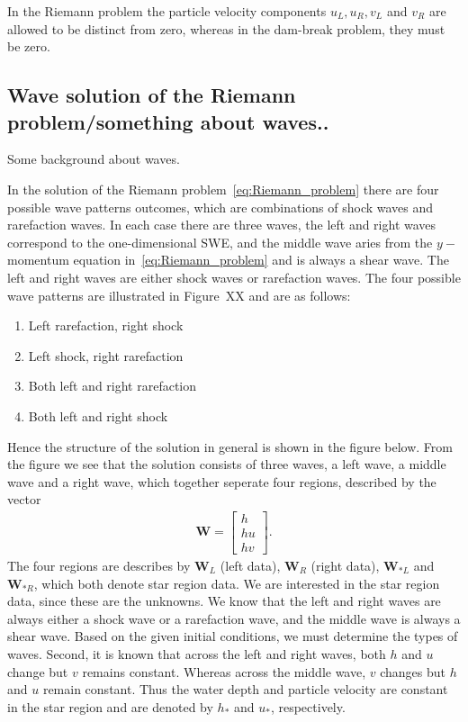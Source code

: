 In the Riemann problem the particle velocity components $u_L, u_R, v_L$ and $v_R$ are allowed to be distinct from zero, whereas in the dam-break problem, they must be zero.


\subsection{Wave solution of the Riemann problem/something about waves..}
Some background about waves.

In the solution of the Riemann problem~\eqref{eq:Riemann_problem} there are four possible wave patterns outcomes, which are combinations of shock waves and rarefaction waves.
In each case there are three waves, the left and right waves correspond to the one-dimensional SWE, and the middle wave aries from the $y-$momentum equation in~\eqref{eq:Riemann_problem} and is always a shear wave.
The left and right waves are either shock waves or rarefaction waves.
The four possible wave patterns are illustrated in Figure~XX and are as follows:
\begin{enumerate}
    \item Left rarefaction, right shock
    \item Left shock, right rarefaction
    \item Both left and right rarefaction
    \item Both left and right shock
\end{enumerate}
Hence the structure of the solution in general is shown in the figure below.
From the figure we see that the solution consists of three waves, a left wave, a middle wave and a right wave, which together seperate four regions, described by the vector
\begin{align*}
\mathbf{W} = \begin{bmatrix}
    h \\ hu \\ hv
    \end{bmatrix}.
\end{align*}
The four regions are describes by $\mathbf{W}_L$ (left data), $\mathbf{W}_R$ (right data), $\mathbf{W}_{*L}$ and $\mathbf{W}_{*R}$, which both denote star region data.
We are interested in the star region data, since these are the unknowns.
We know that the left and right waves are always either a shock wave or a rarefaction wave, and the middle wave is always a shear wave.
Based on the given initial conditions, we must determine the types of waves.
Second, it is known that across the left and right waves, both $h$ and $u$ change but $v$ remains constant.
Whereas across the middle wave, $v$ changes but $h$ and $u$ remain constant.
Thus the water depth and particle velocity are constant in the star region and are denoted by $h_*$ and $u_*$, respectively.


